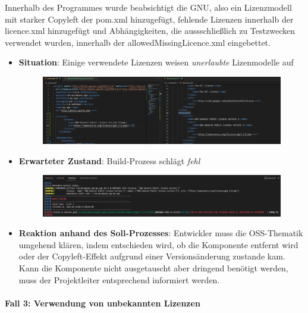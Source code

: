 Innerhalb des Programmes wurde beabsichtigt die GNU, also ein Lizenzmodell mit starker Copyleft der pom.xml hinzugefügt, fehlende Lizenzen innerhalb der licence.xml hinzugefügt und Abhängigkeiten, die aussschließlich zu Testzwecken verwendet wurden, innerhalb der allowedMissingLicence.xml eingebettet. 

\begin{itemize}
    \item \textbf{Situation}: Einige verwendete Lizenzen weisen \textit{unerlaubte} Lizenmodelle auf
    
    \begin{figure}[h]
        \centering
        \includegraphics[scale=0.4]{Bilder/Fall2Situation.png}
    \end{figure}

    \item \textbf{Erwarteter Zustand}: Build-Prozess schlägt \textit{fehl} 
    
    \begin{figure}[h]
        \centering
        \includegraphics[scale=0.4]{Bilder/Fall2Zustand.png}
    \end{figure}

    \item \textbf{Reaktion anhand des Soll-Prozesses}: Entwickler muss die OSS-Thematik umgehend klären, indem entschieden wird, ob die Komponente entfernt wird oder der Copyleft-Effekt aufgrund einer Versionsänderung zustande kam. Kann die Komponente nicht ausgetauscht aber dringend benötigt werden, muss der Projektleiter entsprechend informiert werden.  
\end{itemize}

\paragraph{Fall 3: Verwendung von unbekannten Lizenzen} $~$

